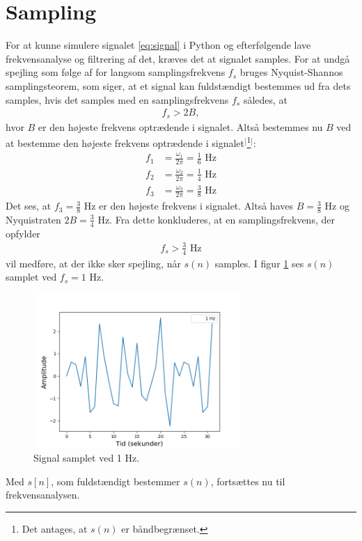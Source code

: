 \section{Sampling}
For at kunne simulere signalet \eqref{eq:signal} i Python og efterfølgende lave frekvensanalyse og filtrering af det, kræves det at signalet samples. 
For at undgå spejling som følge af for langsom samplingsfrekvens $f_s$ bruges Nyquist-Shannos samplingsteorem, som siger, at et signal kan fuldstændigt bestemmes ud fra dets samples, hvis det samples med en samplingsfrekvens $f_s$ således, at
\begin{align}
f_s>2B,
\end{align}
hvor $B$ er den højeste frekvens optrædende i signalet. Altså bestemmes nu $B$ ved at bestemme den højeste frekvens optrædende i signalet$^[$\footnote{Det antages, at $s(n)$ er båndbegrænset.}$^]$:
\begin{align*}
f_1&=\frac{\omega_1}{2\pi}=\frac{1}{6}\text{ Hz}\\
f_2&=\frac{\omega_2}{2\pi}=\frac{1}{4}\text{ Hz}\\
f_3&=\frac{\omega_3}{2\pi}=\frac{3}{8}\text{ Hz}
\end{align*}
Det ses, at $f_3=\frac{3}{8}$ Hz er den højeste frekvens i signalet. Altså haves $B=\frac{3}{8}$ Hz og Nyquistraten $2B=\frac{3}{4}$ Hz. Fra dette konkluderes, at en samplingsfrekvens, der opfylder
\begin{align}
f_s>\frac{3}{4}\text{ Hz}
\end{align}
vil medføre, at der ikke sker spejling, når $s(n)$ samples. I figur \ref{fig:s_sampled} ses $s(n)$ samplet ved $f_s=1$ Hz.
\begin{figure}[H]
\centering
\includegraphics[width=0.7\textwidth]{figures/signal_1hz}
\caption{Signal samplet ved 1 Hz.}
\label{fig:s_sampled}
\end{figure}
Med $s[n]$, som fuldstændigt bestemmer $s(n)$, fortsættes nu til frekvensanalysen.